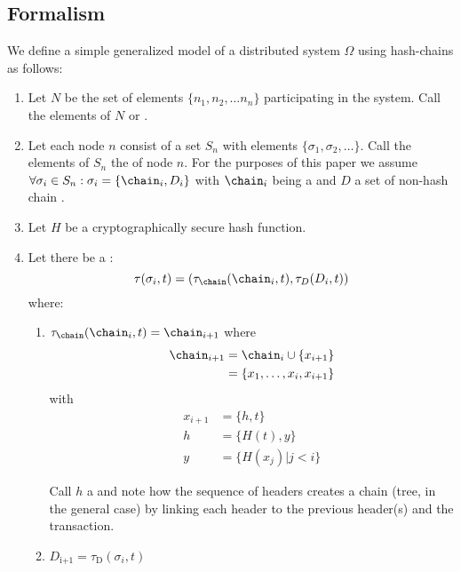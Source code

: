 \documentclass[twocolumn,showpacs,
  nofootinbib,aps,superscriptaddress,
  eqsecnum,prd,notitlepage,showkeys,10pt]{revtex4-1}
\begin{document}
\subsection{Formalism}
\label{sec:formalism}

We define a simple generalized model of a distributed system $\Omega$ using hash-chains as follows:
\begin{enumerate}
\item Let $N$ be the set of elements $\{n_1,n_2,\dots n_n\}$ participating in the system. Call the elements of $N$  or .
\item Let each node $n$ consist of a set $S_n$ with elements $\{\sigma_1,\sigma_2,\dots\}$. Call the elements of $S_n$ the  of node $n$. For the purposes of this paper we assume $\forall \sigma_i \in S_n : \sigma_i = \{ \chain_i, D_i\}$ with $\chain_i$ being a  and $D$  a set of non-hash chain .
\item Let $H$ be a cryptographically secure hash function.
\item Let there be a :
\begin{equation}
\tau(\sigma_i, t) = (\tau_\chain(\chain_i, t), \tau_D(D_i,t))
\end{equation}
where:
\begin{enumerate}
\item
$\tau_\chain(\chain_i,t) = \chain_{i+1}$ where
\begin{equation}
\begin{split}
 \chain_{i+1} &= \chain_{i} \cup \{x_{i+1}\} \\
  &= \{x_1, \dots, x_i, x_{i+1}\}
\end{split}
\end{equation}
with
\begin{equation}
\begin{split}
x_{i+1} &= \{h,t\} \\
h &= \{ H(t),y\} \\
y &= \{H(x_j) | j<i\}
\end{split}
\end{equation}

Call $h$ a  and note how the sequence of headers creates a chain (tree, in the general case) by linking each header to the previous header(s) and the transaction.
\item $D_\text{i+1}=\tau_\mathrm{D}(\sigma_i,t)$


\end{enumerate}
\end{enumerate}
\end{document}
